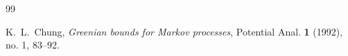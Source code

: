\documentclass[12pt,a4paper]{article}
\newcommand{\1}{{\bf 1}}
\begin{document}
\begin{thebibliography}{99}


%
 {K.~L.~Chung},
 \emph{Greenian bounds for Markov processes}, 
Potential Anal. {\bf 1} (1992), no. 1, 83--92.


%
%
%

%

%
%





\end{thebibliography}
\end{document}
